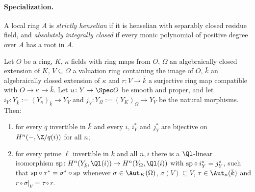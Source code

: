 \paragraph{Specialization.}
A local ring $A$ is \emph{strictly henselian} if it is henselian with separably closed residue field,
and \emph{absolutely integrally closed} if every monic polynomial of positive degree over $A$ has a
root in $A$.

\begin{proposition}[Specialization]\label{prop:pf:steps2:specgood}
Let $O$ be a ring, $K$, $\kappa$ fields with ring maps from $O$, $\Omega$ an algebraically closed
extension of $K$, $V\subseteq\Omega$ a valuation ring containing the image of $O$, $\bar k$ an
algebraically closed extension of $\kappa$ and $r\colon V\to\bar k$ a surjective ring map compatible
with $O\to\kappa\to\bar k$. Let $u\colon Y\to\Spec O$ be smooth and proper, and let
$i_Y\colon Y_{\bar k}:=(Y_\kappa)_{\bar k}\to Y_V$ and $j_Y\colon Y_\Omega:=(Y_K)_\Omega\to Y_V$ be the
natural morphisms. Then:
\begin{enumerate}[label=\textup{(\alph*)},nosep]
\item for every $q$ invertible in $\bar k$ and every $i$, $i_Y^\ast$ and $j_Y^\ast$ are bijective on
  $H^n(-,\Z/q(i))$ for all $n$;
\item for every prime $\ell$ invertible in $\bar k$ and all $n,i$ there is a $\Ql$-linear isomorphism
  $\stepsiisp\colon H^n(Y_{\bar k},\Ql(i))\to H^n(Y_\Omega,\Ql(i))$ with
  $\mathrm{sp}\circ i_Y^\ast=j_Y^\ast$, such that $\mathrm{sp}\circ\tau^\ast=\sigma^\ast\circ\mathrm{sp}$
  whenever $\sigma\in\Aut_K(\Omega)$, $\sigma(V)\subseteq V$, $\tau\in\Aut_\kappa(\bar k)$ and
  $r\circ\sigma|_V=\tau\circ r$.
\end{enumerate}
\end{proposition}

